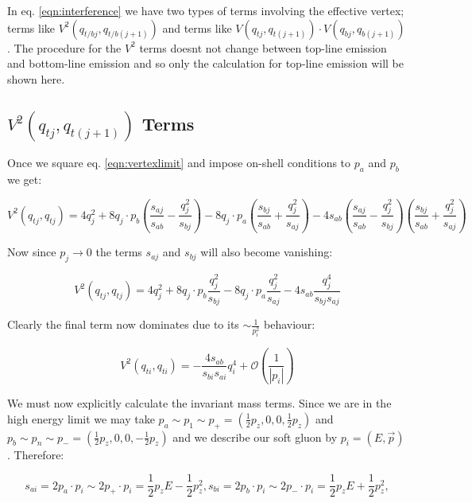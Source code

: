 		In eq. \eqref{eqn:interference} we have two types of terms involving the effective vertex;
		terms like $V^2(q_{t/bj}, q_{t/b(j+1)})$ and terms like $V(q_{tj}, q_{t(j+1)})\cdot V(q_{bj}, q_{b(j+1)})$.
		The procedure for the $V^2$ terms doesnt not change between top-line emission and bottom-line emission
		and so only the calculation for top-line emission will be shown here.

	\subsection{$V^2(q_{tj}, q_{t(j+1)})$ Terms}
	\label{sub:subsection_name}

		Once we square eq. \eqref{eqn:vertexlimit} and impose on-shell conditions to $p_a$ and $p_b$ we get:

		\begin{equation}
			V^2(q_{tj}, q_{tj}) = 4q_j^2 + 8 q_j\cdot p_b \left(\frac{s_{aj}}{s_{ab}} - \frac{q^2_{j}}{s_{bj}}\right) -
				8q_j\cdot p_a \left(\frac{s_{bj}}{s_{ab}} + \frac{q_j^2}{s_{aj}}\right) - 4s_{ab}\left(\frac{s_{aj}}{s_{ab}} -
				\frac{q^2_{j}}{s_{bj}}\right)\left(\frac{s_{bj}}{s_{ab}} + \frac{q_j^2}{s_{aj}}\right)
		\end{equation}

		Now since $p_j\rightarrow0$ the terms $s_{aj}$ and $s_{bj}$ will also become vanishing:

		\begin{equation}
			V^2(q_{tj}, q_{tj}) = 4q_j^2 + 8 q_j\cdot p_b \frac{q^2_{j}}{s_{bj}} - 8 q_j\cdot p_a \frac{q_j^2}{s_{aj}} -
				4s_{ab}\frac{q^4_{j}}{s_{bj}s_{aj}}
		\end{equation}

		Clearly the final term now dominates due to its $\sim\frac{1}{p_i^2}$ behaviour:

		\begin{equation}
			V^2(q_{ti}, q_{ti}) = - \frac{4s_{ab}}{s_{bi}s_{ai}}q^4_{i} + \mathcal{O}\left(\frac{1}{|p_i|}\right)
			\label{eqn:temp}
		\end{equation}

		We must now explicitly calculate the invariant mass terms.  Since we are in the high energy limit we may take
		$p_a\sim p_1 \sim p_+ = (\frac12 p_z, 0, 0, \frac12 p_z)$ and $p_b\sim p_n \sim p_- = (\frac12 p_z, 0, 0, -\frac12 p_z)$
		and we describe our soft gluon by $p_i=(E, \vec{p})$.  Therefore:

		\begin{subequations}
			\begin{equation}
				s_{ai} = 2p_a\cdot p_i\sim2p_+\cdot p_i = \frac12p_zE - \frac12p_z^2,
			\end{equation}
			\begin{equation}
				s_{bi} = 2p_b\cdot p_i\sim2p_-\cdot p_i = \frac12p_zE + \frac12p_z^2,
			\end{equation}
		\end{subequations}

